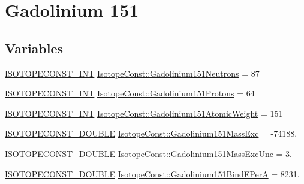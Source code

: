 \hypertarget{group___isotope_const-_gadolinium-_gd151}{}\section{Gadolinium 151}
\label{group___isotope_const-_gadolinium-_gd151}
\subsection*{Variables}
\begin{DoxyCompactItemize}
\item 
\mbox{\hyperlink{group___isotope_const-_macros_ga5f18360b3e99483a35c32d789e62621c}{I\+S\+O\+T\+O\+P\+E\+C\+O\+N\+S\+T\+\_\+\+I\+NT}} \mbox{\hyperlink{group___isotope_const-_gadolinium-_gd151_ga21b7094af1c369d44065c5f4ce1d34d5}{Isotope\+Const\+::\+Gadolinium151\+Neutrons}} = 87
\item 
\mbox{\hyperlink{group___isotope_const-_macros_ga5f18360b3e99483a35c32d789e62621c}{I\+S\+O\+T\+O\+P\+E\+C\+O\+N\+S\+T\+\_\+\+I\+NT}} \mbox{\hyperlink{group___isotope_const-_gadolinium-_gd151_gaf8636b091a9a3ab0579c2837e5fab7bf}{Isotope\+Const\+::\+Gadolinium151\+Protons}} = 64
\item 
\mbox{\hyperlink{group___isotope_const-_macros_ga5f18360b3e99483a35c32d789e62621c}{I\+S\+O\+T\+O\+P\+E\+C\+O\+N\+S\+T\+\_\+\+I\+NT}} \mbox{\hyperlink{group___isotope_const-_gadolinium-_gd151_gaded0afa0907486fa8288ca9b7e618ea6}{Isotope\+Const\+::\+Gadolinium151\+Atomic\+Weight}} = 151
\item 
\mbox{\hyperlink{group___isotope_const-_macros_ga8f45a7272ce02c0b4c65c44636ed719a}{I\+S\+O\+T\+O\+P\+E\+C\+O\+N\+S\+T\+\_\+\+D\+O\+U\+B\+LE}} \mbox{\hyperlink{group___isotope_const-_gadolinium-_gd151_gabd98b2e3e953fa3252a5db3eaf90341b}{Isotope\+Const\+::\+Gadolinium151\+Mass\+Exc}} = -\/74188.
\item 
\mbox{\hyperlink{group___isotope_const-_macros_ga8f45a7272ce02c0b4c65c44636ed719a}{I\+S\+O\+T\+O\+P\+E\+C\+O\+N\+S\+T\+\_\+\+D\+O\+U\+B\+LE}} \mbox{\hyperlink{group___isotope_const-_gadolinium-_gd151_gad1f4e1e885ea87d286ea203056052934}{Isotope\+Const\+::\+Gadolinium151\+Mass\+Exc\+Unc}} = 3.
\item 
\mbox{\hyperlink{group___isotope_const-_macros_ga8f45a7272ce02c0b4c65c44636ed719a}{I\+S\+O\+T\+O\+P\+E\+C\+O\+N\+S\+T\+\_\+\+D\+O\+U\+B\+LE}} \mbox{\hyperlink{group___isotope_const-_gadolinium-_gd151_ga582582057938b8a55c0e647b50e15755}{Isotope\+Const\+::\+Gadolinium151\+Bind\+E\+PerA}} = 8231.

\end{DoxyCompactItemize}
